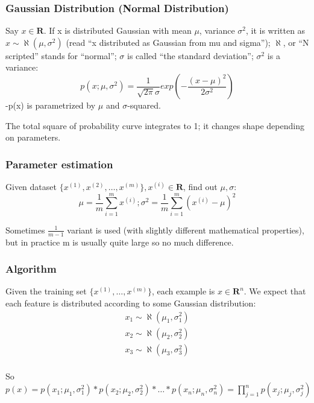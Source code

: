\documentclass{scrartcl}
\begin{document}
\subsubsection{Gaussian Distribution (Normal Distribution)}
\label{sec:15-2}
Say $x \in \mathbf{R}$. If x is distributed Gaussian with mean $\mu$,
variance $\sigma^2$, it is written as $x \sim \aleph(\mu, \sigma^2)$
(read ``x distributed as Gaussian from mu and sigma''); $\aleph$, or
``N scripted'' stands for ``normal''; $\sigma$ is called ``the
standard deviation''; $\sigma^2$ is a variance:
\[ p(x; \mu, \sigma^2) = \frac{1}{\sqrt{2 \pi} \sigma }
exp(-\frac{(x-\mu)^2 }{2\sigma^2}) \] -p(x) is parametrized by $\mu$
and $\sigma$-squared.

The total square of probability curve integrates to 1; it changes
shape depending on parameters.

\subsubsection{Parameter estimation}
Given dataset $\{x^{(1)}, x^{(2)}, \dots, x^{(m)}\}, x^{(i)} \in
\mathbf{R}$, find out $\mu, \sigma$:
\[\mu = \frac{1}{m} \sum \limits_{i=1}^m x^{(i)} ; \sigma^2 =
\frac{1}{m} \sum \limits_{i=1}^m (x^{(i)} - \mu)^2 \]

Sometimes $\frac{1}{m-1}$ variant is used (with slightly different
mathematical properties), but in practice m is usually quite large so
no much difference.

\subsubsection{Algorithm}
\label{sec:15-3}

Given the training set $\{x^{(1)}, \dots, x^{(m)}\}$, each example is
$x \in \mathbf{R}^n$. We expect that each feature is distributed
according to some Gaussian distribution:
\[ \begin{array}{l}
  x_1 \sim \aleph(\mu_1, \sigma_1^2) \\
  x_2 \sim \aleph(\mu_2, \sigma_2^2) \\
  x_3 \sim \aleph(\mu_3, \sigma_3^2) \\
\end{array} \]

So $p(x) = p(x_1;\mu_1, \sigma_1^2)*p(x_2;\mu_2, \sigma_2^2)* \dots
*p(x_n;\mu_n, \sigma_n^2) = \prod \limits_{j=1}^n p(x_j;\mu_j,
\sigma_j^2)$
\end{document}
